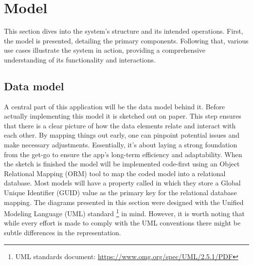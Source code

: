 \newpage

\section{Model}

This section dives into the system's structure and its intended operations. 
First, the model is presented, detailing the primary components. 
Following that, various use cases illustrate the system in action, providing a comprehensive understanding of its functionality and interactions.

\subsection{Data model}

A central part of this application will be the data model behind it. 
Before actually implementing this model it is sketched out on paper. 
This step ensures that there is a clear picture of how the data elements relate and interact with each other. 
By mapping things out early, one can pinpoint potential issues and make necessary adjustments. 
Essentially, it's about laying a strong foundation from the get-go to ensure the app's long-term efficiency and adaptability. 
When the sketch is finished the model will be implemented code-first using an Object Relational Mapping (ORM) tool to map the coded model into a relational database. 
Most models will have a property called  in which they store a Global Unique Identifier (GUID) value as the primary key for the relational database mapping. 
The diagrams presented in this section were designed with the Unified Modeling Language (UML) standard \footnote{UML standards document: \url{https://www.omg.org/spec/UML/2.5.1/PDF}} in mind. 
However, it is worth noting that while every effort is made to comply with the UML conventions there might be subtle differences in the representation. 

